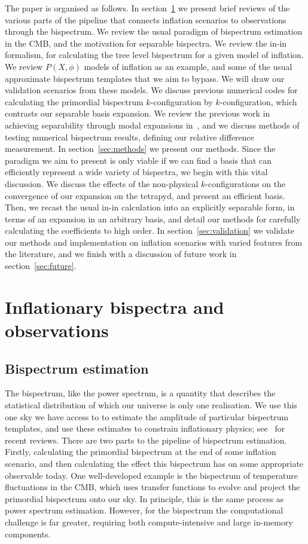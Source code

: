 \documentclass[a4paper,12pt]{extarticle}
\begin{document}
The paper is organised as follows. In section~\ref{sec:review} we present brief reviews
of the various parts of the pipeline that connects inflation scenarios to observations
through the bispectrum.
We review the usual paradigm of bispectrum estimation in the CMB,
and the motivation for separable bispectra. We review the in-in formalism,
for calculating the tree level bispectrum for a given model of inflation.
We review $P(X,\phi)$ models of inflation as an example, and
some of the usual approximate bispectrum templates
that we aim to bypass.
We will draw our validation scenarios from these models.
We discuss previous numerical codes for
calculating the primordial bispectrum $k$-configuration by $k$-configuration,
which contrasts our separable basis expansion.
We review the previous work in achieving separability through modal expansions
in~\cite{Funakoshi},
and we discuss methods of testing
numerical bispectrum results, defining our relative difference measurement.
In section~\ref{sec:methods} we present our methods.
Since the paradigm we aim to present is only viable if we can find a basis
that can efficiently represent a wide variety of bispectra,
we begin with this vital discussion. We discuss the effects of the
non-physical $k$-configurations on the convergence of our expansion on
the tetrapyd, and present an efficient basis.
Then, we recast the usual in-in calculation into an explicitly separable form,
in terms of an expansion in an arbitrary basis,
and detail our methods for carefully calculating the coefficients to high order.
In section~\ref{sec:validation} we validate our methods and implementation
on inflation scenarios with varied features from the literature,
and we finish with a discussion of future work in section~\ref{sec:future}.


\section{Inflationary bispectra and observations}\label{sec:review}
\subsection{Bispectrum estimation}\label{sec:rev_bis_est}
The bispectrum, like the power spectrum, is a quantity that describes
the statistical distribution of which our universe is only one realisation.
We use this one sky we have access to to estimate the amplitude of
particular bispectrum templates,
and use these estimates to constrain inflationary physics; 
see~\cite{astro2020_features,astro2020_png} for recent reviews.
There are two parts to the pipeline of bispectrum estimation.
Firstly, calculating the primordial bispectrum at the end of some inflation scenario,
and then calculating the effect this bispectrum
has on some appropriate observable today.
One well-developed example is
the bispectrum of temperature fluctuations in the CMB, which uses transfer functions
to evolve and project the primordial bispectrum onto our sky.
In principle, this is the same process as power spectrum estimation.
However, for the bispectrum the computational challenge is far greater,
requiring both compute-intensive and large in-memory components.
\end{document}
